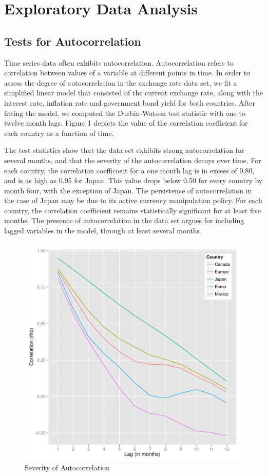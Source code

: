 \documentclass{sig-alternate-05-2015}
\begin{document}
\section{Exploratory Data Analysis}

\subsection{Tests for Autocorrelation}
Time series data often exhibits autocorrelation. Autocorrelation refers to correlation between values of a variable at different points in time. In order to assess the degree of autocorrelation in the exchange rate data set, we fit a simplified linear model that consisted of the current exchange rate, along with the interest rate, inflation rate and government bond yield for both countries. After fitting the model, we computed the Durbin-Watson test statistic with one to twelve month lags. Figure 1 depicts the value of the correlation coefficient for each country as a function of time.
\par{} The test statistics show that the data set exhibits strong autocorrelation for several months, and that the severity of the autocorrelation decays over time. For each country, the correlation coefficient for a one month lag is in excess of 0.80, and is as high as 0.95 for Japan. This value drops below 0.50 for every country by month four, with the exception of Japan. The persistence of autocorrelation in the case of Japan may be due to its active currency manipulation policy. For each country, the correlation coefficient remains statistically significant for at least five months. The presence of autocorrelation in the data set argues for including lagged variables in the model, through at least several months.

\begin{figure}
\centering
\caption{Severity of Autocorrelation}
\includegraphics[scale=0.55]{autocorrelation.pdf}
\end{figure}
\end{document}
